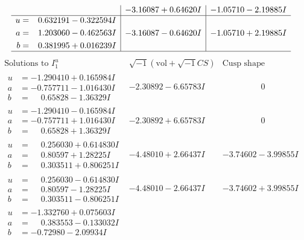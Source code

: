 \documentclass[1p]{elsarticle_modified}
\theoremstyle{definition}
\newcommand{\I}{\sqrt{-1}}
\begin{document}
$$\begin{array}{c|c|c}
 & -3.16087 + 0.64620 I & -1.05710 - 2.19885 I \\ \hline\begin{aligned}
u &= \phantom{-}0.632191 - 0.322594 I \\
a &= \phantom{-}1.203060 - 0.462563 I \\
b &= \phantom{-}0.381995 + 0.016239 I\end{aligned}
 & -3.16087 - 0.64620 I & -1.05710 + 2.19885 I\\
 \hline 
 \end{array}$$\newpage$$\begin{array}{c|c|c}  
\text{Solutions to }I^u_{1}& \I (\text{vol} + \sqrt{-1}CS) & \text{Cusp shape}\\
 \hline 
\begin{aligned}
u &= -1.290410 + 0.165984 I \\
a &= -0.757711 - 1.016430 I \\
b &= \phantom{-}0.65828 - 1.36329 I\end{aligned}
 & -2.30892 - 6.65783 I & \phantom{-0.000000 } 0 \\ \hline\begin{aligned}
u &= -1.290410 - 0.165984 I \\
a &= -0.757711 + 1.016430 I \\
b &= \phantom{-}0.65828 + 1.36329 I\end{aligned}
 & -2.30892 + 6.65783 I & \phantom{-0.000000 } 0 \\ \hline\begin{aligned}
u &= \phantom{-}0.256030 + 0.614830 I \\
a &= \phantom{-}0.80597 + 1.28225 I \\
b &= \phantom{-}0.303511 + 0.806251 I\end{aligned}
 & -4.48010 + 2.66437 I & -3.74602 - 3.99855 I \\ \hline\begin{aligned}
u &= \phantom{-}0.256030 - 0.614830 I \\
a &= \phantom{-}0.80597 - 1.28225 I \\
b &= \phantom{-}0.303511 - 0.806251 I\end{aligned}
 & -4.48010 - 2.66437 I & -3.74602 + 3.99855 I \\ \hline\begin{aligned}
u &= -1.332760 + 0.075603 I \\
a &= \phantom{-}0.383553 - 0.133032 I \\
b &= -0.72980 - 2.09934 I\end{aligned}

\end{array}$$
\end{document}
